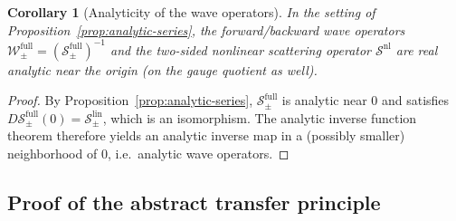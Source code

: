 \documentclass[11pt]{article}
\numberwithin{equation}{section}
\theoremstyle{plain}
\newtheorem{corollary}[theorem]{Corollary}
\theoremstyle{definition}
\theoremstyle{remark}
\begin{document}
\begin{corollary}[Analyticity of the wave operators]\label{cor:analytic-waveops}
In the setting of Proposition~\ref{prop:analytic-series}, the forward/backward wave operators $\mathscr W_{\pm}^{\mathrm{full}}=(\mathscr S_{\pm}^{\mathrm{full}})^{-1}$ and the two-sided nonlinear scattering operator $\mathscr S^{\mathrm{nl}}$ are real analytic near the origin (on the gauge quotient as well).
\end{corollary}

\begin{proof}
By Proposition~\ref{prop:analytic-series}, $\mathscr S_{\pm}^{\mathrm{full}}$ is analytic near $0$ and satisfies $D\mathscr S_{\pm}^{\mathrm{full}}(0)=\mathscr S_{\pm}^{\mathrm{lin}}$, which is an isomorphism.
The analytic inverse function theorem therefore yields an analytic inverse map in a (possibly smaller) neighborhood of $0$, i.e.\ analytic wave operators.
\end{proof}


\medskip




\subsection{Proof of the abstract transfer principle}\label{subsec:abstract-transfer-proof}
\end{document}
